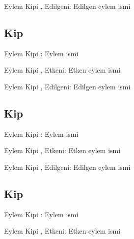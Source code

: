 \begin{eylemkipi}{Eylem Kipi , Edilgeni: }
  Edilgen eylem ismi
\end{eylemkipi}


\subsection*{Kip }

\begin{eylemkipi}{Eylem Kipi : }
  Eylem ismi
\end{eylemkipi}

\begin{eylemkipi}{Eylem Kipi , Etkeni: }
  Etken eylem ismi
\end{eylemkipi}

\begin{eylemkipi}{Eylem Kipi , Edilgeni: }
  Edilgen eylem ismi
\end{eylemkipi}


\subsection*{Kip }

\begin{eylemkipi}{Eylem Kipi : }
  Eylem ismi
\end{eylemkipi}

\begin{eylemkipi}{Eylem Kipi , Etkeni: }
  Etken eylem ismi
\end{eylemkipi}

\begin{eylemkipi}{Eylem Kipi , Edilgeni: }
  Edilgen eylem ismi
\end{eylemkipi}


\subsection*{Kip }

\begin{eylemkipi}{Eylem Kipi : }
  Eylem ismi
\end{eylemkipi}

\begin{eylemkipi}{Eylem Kipi , Etkeni: }
  Etken eylem ismi
\end{eylemkipi}

